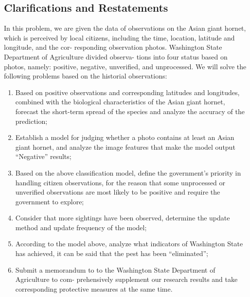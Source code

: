 \documentclass[../mcmpaper]{subfiles}
\begin{document}
    \subsection{Clarifications and Restatements}
    In this problem, we are given the data of observations on the Asian giant hornet, which is perceived by local citizens, including the time, location, latitude and longitude, and the cor- responding observation photos. Washington State Department of Agriculture divided observa- tions into four status based on photos, namely: positive, negative, unverified, and unprocessed. We will solve the following problems based on the historial observations:
    \begin{enumerate}[label=\arabic*., format=\bfseries, itemindent=2\parindent, leftmargin=0pt, topsep=0pt, parsep=0pt]
        \item Based on positive observations and corresponding latitudes and longitudes, combined with the biological characteristics of the Asian giant hornet, forecast the short-term spread of the species and analyze the accuracy of the prediction;
        \item Establish a model for judging whether a photo contains at least an Asian giant hornet, and analyze the image features that make the model output ``Negative'' results;
        \item Based on the above classiﬁcation model, deﬁne the government’s priority in handling citizen observations, for the reason that some unprocessed or unveriﬁed observations are most likely to be positive and require the government to explore;
        \item Consider that more sightings have been observed, determine the update method and update frequency of the model;
        \item According to the model above, analyze what indicators of Washington State has achieved, it can be said that the pest has been “eliminated”;
        \item Submit a memorandum to to the Washington State Department of Agriculture to com- prehensively supplement our research results and take corresponding protective measures at the same time.
    \end{enumerate}
\end{document}
